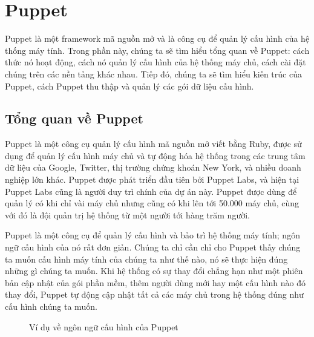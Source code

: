 \section{Puppet}
Puppet là một framework mã nguồn mở và là công cụ để quản lý cấu hình của hệ thống máy tính. Trong phần này, chúng ta sẽ tìm hiểu tổng quan về Puppet: cách thức nó hoạt động, cách nó quản lý cấu hình của hệ thống máy chủ, cách cài đặt chúng trên các nền tảng khác nhau. Tiếp đó, chúng ta sẽ tìm hiểu kiến trúc của Puppet, cách Puppet thu thập và quản lý các gói dữ liệu cấu hình.

\subsection{Tổng quan về Puppet}
Puppet là một công cụ quản lý cấu hình mã nguồn mở viết bằng Ruby, được sử dụng để quản lý cấu hình máy chủ và tự động hóa hệ thống trong các trung tâm dữ liệu của Google, Twitter, thị trường chứng khoán New York, và nhiều doanh nghiệp lớn khác. Puppet được phát triển đầu tiên bởi Puppet Labs, và hiện tại Puppet Labs cũng là người duy trì chính của dự án này. Puppet được dùng để quản lý có khi chỉ vài máy chủ nhưng cũng có khi lên tới 50.000 máy chủ, cùng với đó là đội quản trị hệ thống từ một người tới hàng trăm người.

Puppet là một công cụ để quản lý cấu hình và bảo trì hệ thống máy tính; ngôn ngữ cấu hình của nó rất đơn giản. Chúng ta chỉ cần chỉ cho Puppet thấy chúng ta muốn cấu hình máy tính của chúng ta như thế nào, nó sẽ thực hiện đúng những gì chúng ta muốn. Khi hệ thống có sự thay đổi chẳng hạn như một phiên bản cập nhật của gói phần mềm, thêm người dùng mới hay một cấu hình nào đó thay đổi, Puppet tự động cập nhật tất cả các máy chủ trong hệ thống đúng như cấu hình chúng ta muốn.

\begin{figure}[htb]
    \begin{center}
    \end{center}
    \caption{Ví dụ về ngôn ngữ cấu hình của Puppet}
    \label{fig:puppet_ssh_pp}
\end{figure}


